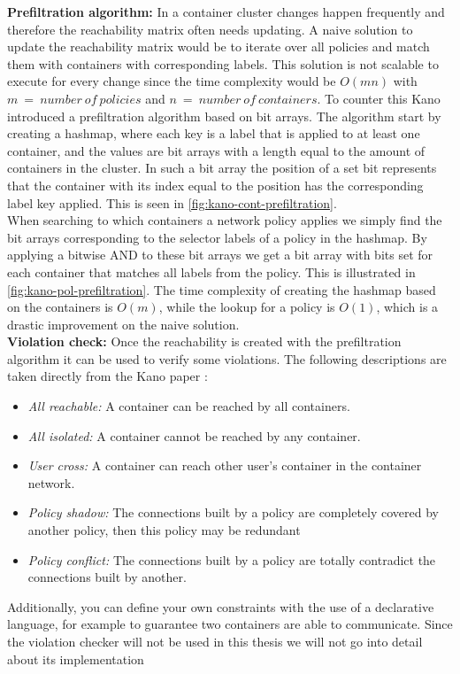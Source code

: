 \textbf{Prefiltration algorithm:} \label{kano:prefiltration} In a container cluster changes happen frequently and therefore the reachability matrix often needs updating. A naive solution to update the reachability matrix would be to iterate over all policies and match them with containers with corresponding labels. This solution is not scalable to execute for every change since the time complexity would be $O(mn)$ with $m\ =\ number\ of\ policies$ and $n\ =\ number\ of\ containers$. To counter this Kano introduced a prefiltration algorithm based on bit arrays. The algorithm start by creating a hashmap, where each key is a label that is applied to at least one container, and the values are bit arrays with a length equal to the amount of containers in the cluster. In such a bit array the position of a set bit represents that the container with its index equal to the position has the corresponding label key applied. This is seen in \autoref{fig:kano-cont-prefiltration}.
\\[10pt] 

When searching to which containers a network policy applies we simply find the bit arrays corresponding to the selector labels of a policy in the hashmap. By applying a bitwise AND to these bit arrays we get a bit array with bits set for each container that matches all labels from the policy. This is illustrated in \autoref{fig:kano-pol-prefiltration}. The time complexity of creating the hashmap based on the containers is $O(m)$, while the lookup for a policy is $O(1)$, which is a drastic improvement on the naive solution.
\\[10pt]

\textbf{Violation check:} \label{kano:violationcheck} Once the reachability is created with the prefiltration algorithm it can be used to verify some violations. The following descriptions are taken directly from the Kano paper \cite{kano}:
\begin{itemize}
    \renewcommand{\labelitemi}{\scriptsize$\blacksquare$}
    \item \textit{All reachable:} A container can be reached by all containers.
    \item \textit{All isolated:} A container cannot be reached by any container.
    \item \textit{User cross:} A container can reach other user’s container in the container network.
    \item \textit{Policy shadow:} The connections built by a policy are completely covered by another policy, then this policy may be redundant
    \item \textit{Policy conflict:} The connections built by a policy are totally contradict the connections built by another.
\end{itemize}
Additionally, you can define your own constraints with the use of a declarative language, for example to guarantee two containers are able to communicate. Since the violation checker will not be used in this thesis we will not go into detail about its implementation
\\[10pt]


